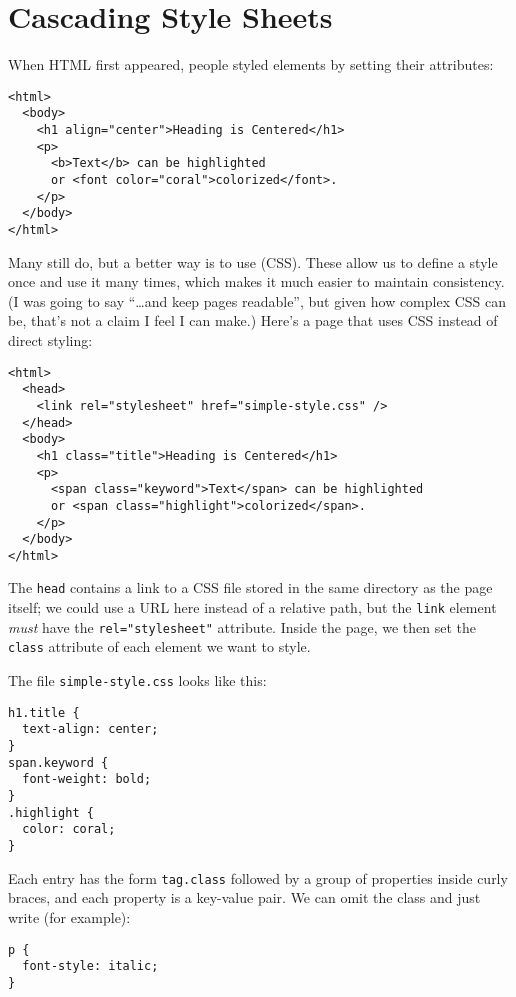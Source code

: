 \section{Cascading Style Sheets}\label{s:htmlcss-css}

When HTML first appeared, people styled elements by setting their attributes:

\begin{verbatim}
<html>
  <body>
    <h1 align="center">Heading is Centered</h1>
    <p>
      <b>Text</b> can be highlighted
      or <font color="coral">colorized</font>.
    </p>
  </body>
</html>
\end{verbatim}

Many still do,
but a better way is to use  (CSS).
These allow us to define a style once and use it many times,
which makes it much easier to maintain consistency.
(I was going to say ``{\ldots}and keep pages readable'',
but given how complex CSS can be,
that's not a claim I feel I can make.)
Here's a page that uses CSS instead of direct styling:

\begin{verbatim}
<html>
  <head>
    <link rel="stylesheet" href="simple-style.css" />
  </head>
  <body>
    <h1 class="title">Heading is Centered</h1>
    <p>
      <span class="keyword">Text</span> can be highlighted
      or <span class="highlight">colorized</span>.
    </p>
  </body>
</html>
\end{verbatim}

The \texttt{head} contains a link to a CSS file stored in the same directory as the page itself;
we could use a URL here instead of a relative path,
but the \texttt{link} element \emph{must} have the \texttt{rel="stylesheet"} attribute.
Inside the page,
we then set the \texttt{class} attribute of each element we want to style.

The file \texttt{simple-style.css} looks like this:

\begin{verbatim}
h1.title {
  text-align: center;
}
span.keyword {
  font-weight: bold;
}
.highlight {
  color: coral;
}
\end{verbatim}

\noindent
Each entry has the form \texttt{tag.class} followed by a group of properties inside curly braces,
and each property is a key-value pair.
We can omit the class and just write (for example):

\begin{verbatim}
p {
  font-style: italic;
}
\end{verbatim}

